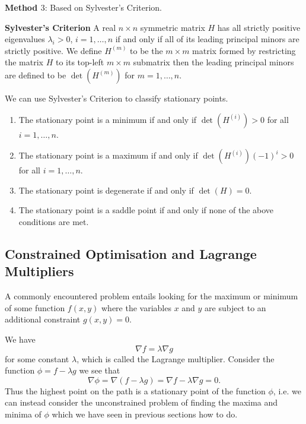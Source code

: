 \documentclass[10pt, a4paper]{article}
\begin{document}
\textbf{Method $3$}:
Based on Sylvester's Criterion.

\textbf{Sylvester's Criterion}
A real $n \times n$ symmetric matrix $H$ has all strictly positive eigenvalues $\lambda_i > 0$,
$i = 1, \dotsc, n$ if and only if all of its leading principal minors are strictly positive.
We define $H ^ {(m)}$ to be the $m \times m$ matrix formed by restricting the matrix $H$ to its top-left $m \times m$ submatrix then the leading principal minors are defined to be $\det(H ^ {(m)})$ for $m = 1, \dotsc, n$.

We can use Sylvester's Criterion to classify stationary points.
\begin{enumerate}[label = (\arabic*)]
    \item The stationary point is a minimum if and only if $\det(H ^ {(i)}) > 0$ for all $i = 1, \dotsc, n$.
    
    \item The stationary point is a maximum if and only if $\det(H ^ {(i)})(-1) ^ i > 0$ for all $i = 1, \dotsc, n$.
    
    \item The stationary point is degenerate if and only if $\det(H) = 0$.

    \item The stationary point is a saddle point if and only if none of the above conditions are met.
\end{enumerate}

\subsection{Constrained Optimisation and Lagrange Multipliers}

A commonly encountered problem entails looking for the maximum or minimum of some function $f(x, y)$ where the variables $x$ and $y$ are subject to an additional constraint $g(x, y) = 0$.

We have
\[
\nabla f = \lambda\nabla g
\]
for some constant $\lambda$,
which is called the Lagrange multiplier.
Consider the function $\phi = f - \lambda g$ we see that
\[
\nabla \phi = \nabla(f - \lambda g) = \nabla f - \lambda\nabla g = 0.
\]
Thus the highest point on the path is a stationary point of the function $\phi$,
i.e. we can instead consider the unconstrained problem of finding the maxima and minima of $\phi$ which we have seen in previous sections how to do.
\end{document}
